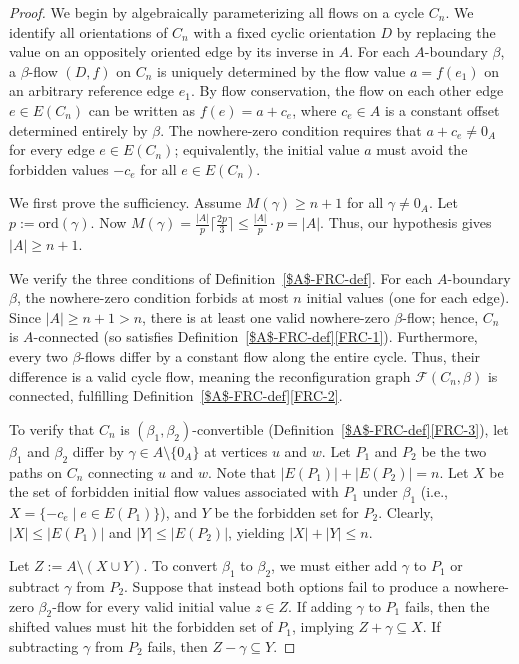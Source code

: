 \documentclass[a4paper,12pt]{article}
\theoremstyle{plain}
\theoremstyle{definition}
\renewcommand\le\leqslant
\renewcommand\ge\geqslant
\newcommand\ord{\textrm{ord}}
\begin{document}
\begin{proof}
We begin by algebraically
parameterizing all flows on a cycle $C_n$. We identify all orientations of $C_n$ with a fixed cyclic orientation $D$ by replacing the value on an oppositely oriented edge by its inverse in $A$. For each $A$-boundary $\beta$, a $\beta$-flow $(D, f)$ on $C_n$ is uniquely determined by the flow value $a = f(e_1)$ on an arbitrary reference edge $e_1$. By flow conservation, the flow on each other edge $e \in E(C_n)$ can be written as $f(e) = a + c_e$, where $c_e \in A$ is a constant offset determined entirely by $\beta$.
The nowhere-zero condition requires that $a+c_e \neq 0_A$ for every edge $e\in E(C_n)$; equivalently, the initial value $a$ must avoid the forbidden values $-c_e$ for all $e\in E(C_n)$.

We first prove the sufficiency. Assume $M(\gamma) \ge n + 1$ for all $\gamma \neq 0_A$. 
Let $p:=\ord(\gamma)$.
Now $M(\gamma) = \frac{|A|}{p}\lceil \frac{2p}{3} \rceil \le \frac{|A|}{p} \cdot p = |A|$. Thus, our hypothesis gives $|A| \ge n+1$.

We verify the three conditions of Definition~\ref{$A$-FRC-def}. For each $A$-boundary $\beta$, the nowhere-zero condition forbids at most $n$ initial values (one for each edge). Since $|A| \ge n+1 > n$, there is at least one valid nowhere-zero $\beta$-flow; hence, $C_n$ is $A$-connected (so satisfies Definition~\ref{$A$-FRC-def}\ref{FRC-1}). Furthermore, every two $\beta$-flows differ by a constant flow along the entire cycle. Thus, their difference is a valid cycle flow, meaning the reconfiguration graph $\mathcal{F}(C_n, \beta)$ is connected, fulfilling Definition~\ref{$A$-FRC-def}\ref{FRC-2}.

To verify that $C_n$ is
$(\beta_1, \beta_2)$-convertible (Definition~\ref{$A$-FRC-def}\ref{FRC-3}), let $\beta_1$ and $\beta_2$ differ by $\gamma \in A \setminus \{0_A\}$ at vertices $u$ and $w$. Let $P_1$ and $P_2$ be the two paths on $C_n$ connecting $u$ and $w$. Note that $|E(P_1)| + |E(P_2)| = n$. Let $X$ be the set of forbidden initial flow values associated with $P_1$ under $\beta_1$ (i.e., $X = \{-c_e \mid e \in E(P_1)\}$), and $Y$ be the forbidden set for $P_2$. Clearly, $|X| \le |E(P_1)|$ and $|Y| \le |E(P_2)|$, yielding $|X| + |Y| \le n$. 

Let $Z:=A\setminus (X\cup Y)$.
To convert $\beta_1$ to $\beta_2$, we must either add $\gamma$ to $P_1$ or subtract $\gamma$ from $P_2$. Suppose  that instead both options fail to produce a nowhere-zero $\beta_2$-flow for every valid initial value $z \in Z$. If adding $\gamma$ to $P_1$ fails, then the shifted values must hit the forbidden set of $P_1$, implying $Z + \gamma \subseteq X$. If subtracting $\gamma$ from $P_2$ fails, then $Z - \gamma \subseteq Y$. 


\end{proof}
\end{document}
